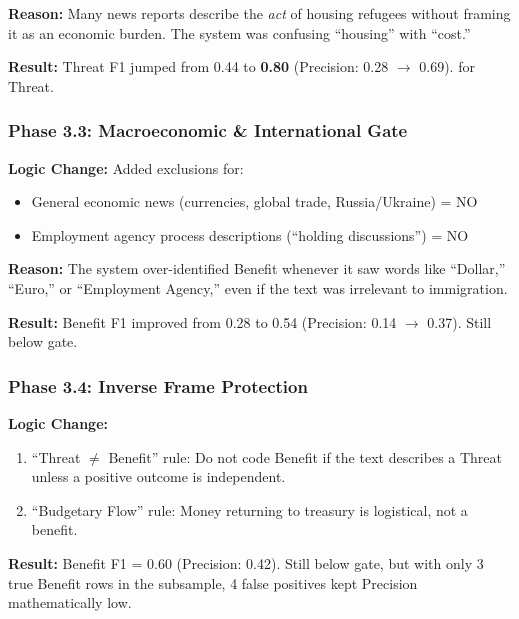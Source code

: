 \textbf{Reason:} Many news reports describe the \textit{act} of housing refugees without framing it as an economic burden. The system was confusing ``housing'' with ``cost.''

\textbf{Result:} Threat F1 jumped from 0.44 to \textbf{0.80} (Precision: 0.28 $\rightarrow$ 0.69). \passmark{} for Threat.

\subsubsection{Phase 3.3: Macroeconomic \& International Gate}

\textbf{Logic Change:} Added exclusions for:
\begin{itemize}
    \item General economic news (currencies, global trade, Russia/Ukraine) = NO
    \item Employment agency process descriptions (``holding discussions'') = NO
\end{itemize}

\textbf{Reason:} The system over-identified Benefit whenever it saw words like ``Dollar,'' ``Euro,'' or ``Employment Agency,'' even if the text was irrelevant to immigration.

\textbf{Result:} Benefit F1 improved from 0.28 to 0.54 (Precision: 0.14 $\rightarrow$ 0.37). Still below gate.

\subsubsection{Phase 3.4: Inverse Frame Protection}

\textbf{Logic Change:}
\begin{enumerate}
    \item ``Threat $\neq$ Benefit'' rule: Do not code Benefit if the text describes a Threat unless a positive outcome is independent.
    \item ``Budgetary Flow'' rule: Money returning to treasury is logistical, not a benefit.
\end{enumerate}

\textbf{Result:} Benefit F1 = 0.60 (Precision: 0.42). Still below gate, but with only 3 true Benefit rows in the subsample, 4 false positives kept Precision mathematically low.

\newpage
